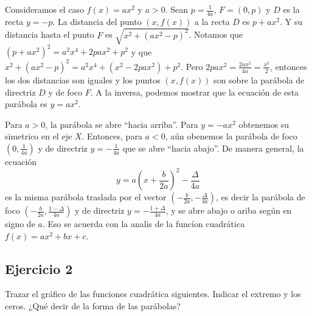 Consideramos el caso $f(x) = ax^2$ y $a > 0$. Sean $p = \frac{1}{4{a}}$,
$F = {(0, p)}$ y $D$ es la recta $y = -p$. La distancia del punto $(x, {f(x)})$
a la recta $D$ es $p + ax^2$. Y su distancia hasta el punto $F$ es
$\sqrt{x^2 + (ax^2 - p)^2}$. Notamos que
${(p+ax^2)}^2 = a^2 x^4 + 2pax^2 + p^2$ y que
$x^2 + (ax^2 - p)^2 = a^2 x^4 + {(x^2 - 2pax^2)} + p^2$. Pero
$2pax^2 = \frac{2ax^2}{4a} = \frac{x^2}{2}$, entonces los dos distancias son
iguales y los puntos $(x, {f(x)})$ son sobre la parábola de directriz $D$ y
de foco $F$. A la inversa, podemos mostrar que la ecuación de esta parábola es
$y = ax^2$.

\begin{center}
\end{center}

Para $a > 0$, la parábola se abre ``hacia arriba''. Para $y = -ax^2$ obtenemos
su simetrico en el eje $X$.
Entonces, para $a < 0$, aún obenemos la parábola de foco
$\left(0, \frac{1}{4{a}}\right)$ y de directriz $y = -\frac{1}{4{a}}$ que se
abre ``hacia abajo''. De manera general, la ecuación
$$y = a \left( x + \frac{b}{2a}\right)^2 - \frac{\Delta}{4a}$$
es la misma parábola traslada por el vector
$\left(-\frac{b}{2a}, -\frac{\Delta}{4a}\right)$, es decir la parábola de foco
$\left(-\frac{b}{2a}, \frac{1 - \Delta}{4{a}}\right)$ y de directriz
$y = -\frac{1 + \Delta}{4{a}}$, y se abre abajo o ariba según en signo de $a$.
Eso se acuerda con la analis de la funcíon cuadrática $f(x) = ax^2+bx+c$.

\subsection*{Ejercicio 2}

Trazar el gráfico de las funciones cuadrática siguientes.
Indicar el extremo y los ceros. ¿Qué decir de la forma de las parábolas?

